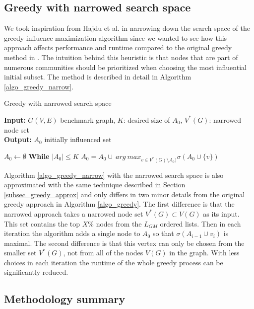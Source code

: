\documentclass[pdflatex,sn-mathphys-ay]{sn-jnl}
\begin{document}
\subsection{Greedy with narrowed search space}\label{subsec_narrowed}

We took inspiration from Hajdu et al. \citep{evaluating} in narrowing down the search space of the greedy influence maximization algorithm since we wanted to see how this approach affects performance and runtime compared to the original greedy method in \citep{kempe}. The intuition behind this heuristic is that nodes that are part of numerous communities should be prioritized when choosing the most influential initial subset. The method is described in detail in Algorithm \ref{algo_greedy_narrow}.

\begin{algorithm}[ht]
\caption{Greedy with narrowed search space}
\label{algo_greedy_narrow}
\textbf{Input:} $G(V,E)$ benchmark graph, $K$: desired size of $A_0$, $V^*(G)$: narrowed node set
\\
\textbf{Output:} $A_{0}$ initially influenced set
\begin{algorithmic}[1]
    \State $A_0 \leftarrow \emptyset$
    \State \textbf{While} $|A_{0}| \leq K$
    \State \hspace{\algorithmicindent} $A_{0}=A_{0} \cup \ arg \ max_{v \in V^*(G) \setminus A_{0})} \sigma(A_{0} \cup \{v\})$
\end{algorithmic}
\end{algorithm}

Algorithm \ref{algo_greedy_narrow} with the narrowed search space is also approximated with the same technique described in Section \ref{subsec_greedy_approx} and only differs in two minor details from the original greedy approach in Algorithm \ref{algo_greedy}. The first difference is that the narrowed approach takes a narrowed node set $V^*(G) \subset V(G)$ as its input. This set contains the top $X\%$ nodes from the $L_{GM}$ ordered lists. Then in each iteration the algorithm adds a single node to $A_{0}$ so that $\sigma(A_{i-1} \cup {v_i})$ is maximal. The second difference is that this vertex can only be chosen from the smaller set $V^*(G)$, not from all of the nodes $V(G)$ in the graph. With less choices in each iteration the runtime of the whole greedy process can be significantly reduced.


\subsection{Methodology summary}\label{subsec_method_summ}
\end{document}
